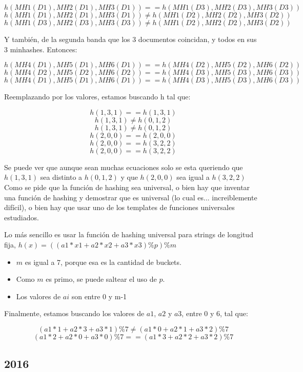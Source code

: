 \documentclass[a4paper]{article}
\begin{document}
    $$h(MH1(D1),MH2(D1),MH3(D1)) == h(MH1(D3),MH2(D3),MH3(D3))$$
    $$h(MH1(D1),MH2(D1),MH3(D1)) \neq h(MH1(D2),MH2(D2),MH3(D2))$$
    $$h(MH1(D3),MH2(D3),MH3(D3)) \neq h(MH1(D2),MH2(D2),MH3(D2))$$

    Y también, de la segunda banda que los 3 documentos coincidan, y todos en sus 3 minhashes. Entonces:

    $$h(MH4(D1),MH5(D1),MH6(D1)) == h(MH4(D2),MH5(D2),MH6(D2))$$
    $$h(MH4(D2),MH5(D2),MH6(D2)) == h(MH4(D3),MH5(D3),MH6(D3))$$
    $$h(MH4(D1),MH5(D1),MH6(D1)) == h(MH4(D3),MH5(D3),MH6(D3))$$
   
    Reemplazando por los valores, estamos buscando h tal que:

    $$h(1,3,1) == h(1,3,1)$$
    $$h(1,3,1) \neq h(0,1,2)$$
    $$h(1,3,1) \neq h(0,1,2)$$
    $$h(2,0,0) == h(2,0,0)$$
    $$h(2,0,0) == h(3,2,2)$$
    $$h(2,0,0) == h(3,2,2)$$
    
    Se puede ver que aunque sean muchas ecuaciones solo se esta queriendo que $h(1,3,1)$ sea distinto a $h(0,1,2)$ y que $h(2,0,0)$ sea igual a $h(3,2,2)$ \\
    
    Como se pide que la función de hashing sea universal, o bien hay que inventar una función de hashing y demostrar que es universal (lo cual es... increiblemente difícil), o bien hay que usar uno de los templates de funciones universales estudiados.

    Lo más sencillo es usar la función de hashing universal para strings de longitud fija, $h(x) = ((a1*x1 + a2 * x2 + a3 * x3) \% p) \% m$ 
    
    \begin{itemize}
        \item $m$ es igual a 7, porque esa es la cantidad de buckets. 
        \item Como $m$ es primo, se puede saltear el uso de $p$.
        \item Los valores de $ai$ son entre 0 y m-1
    \end{itemize}

    Finalmente, estamos buscando los valores de $a1$, $a2$ y $a3$, entre 0 y 6, tal que:

    $$(a1*1 + a2 * 3 + a3 * 1) \% 7 \neq (a1*0 + a2 * 1 + a3 * 2) \% 7$$ 
    $$(a1*2 + a2 * 0 + a3 * 0) \% 7 == (a1*3 + a2 * 2 + a3 * 2) \% 7$$ 

    \subsection{2016}
\end{document}
